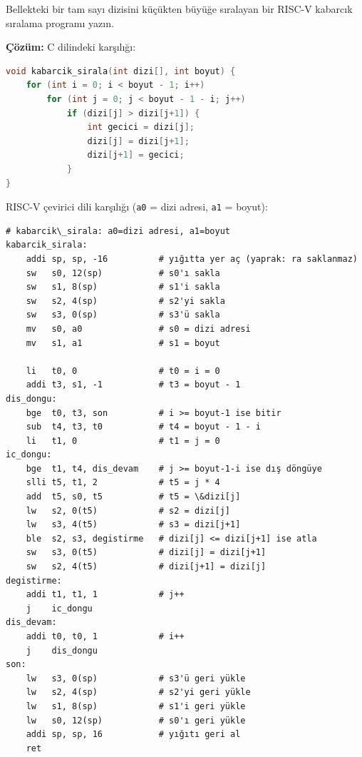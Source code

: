 \begin{ornek}[4.8]
\label{orn:kabarcik-siralama}
Bellekteki bir tam sayı dizisini küçükten büyüğe sıralayan bir RISC-V kabarcık sıralama programı yazın.

\textbf{Çözüm:} C dilindeki karşılığı:

\begin{lstlisting}[language=C, style=alistirma-kod]
void kabarcik_sirala(int dizi[], int boyut) {
    for (int i = 0; i < boyut - 1; i++)
        for (int j = 0; j < boyut - 1 - i; j++)
            if (dizi[j] > dizi[j+1]) {
                int gecici = dizi[j];
                dizi[j] = dizi[j+1];
                dizi[j+1] = gecici;
            }
}
\end{lstlisting}

RISC-V çevirici dili karşılığı (\texttt{a0} = dizi adresi, \texttt{a1} = boyut):

\begin{lstlisting}[style=riscv]
# kabarcik\_sirala: a0=dizi adresi, a1=boyut
kabarcik_sirala:
    addi sp, sp, -16          # yığıtta yer aç (yaprak: ra saklanmaz)
    sw   s0, 12(sp)           # s0'ı sakla
    sw   s1, 8(sp)            # s1'i sakla
    sw   s2, 4(sp)            # s2'yi sakla
    sw   s3, 0(sp)            # s3'ü sakla
    mv   s0, a0               # s0 = dizi adresi
    mv   s1, a1               # s1 = boyut

    li   t0, 0                # t0 = i = 0
    addi t3, s1, -1           # t3 = boyut - 1
dis_dongu:
    bge  t0, t3, son          # i >= boyut-1 ise bitir
    sub  t4, t3, t0           # t4 = boyut - 1 - i
    li   t1, 0                # t1 = j = 0
ic_dongu:
    bge  t1, t4, dis_devam    # j >= boyut-1-i ise dış döngüye
    slli t5, t1, 2            # t5 = j * 4
    add  t5, s0, t5           # t5 = \&dizi[j]
    lw   s2, 0(t5)            # s2 = dizi[j]
    lw   s3, 4(t5)            # s3 = dizi[j+1]
    ble  s2, s3, degistirme   # dizi[j] <= dizi[j+1] ise atla
    sw   s3, 0(t5)            # dizi[j] = dizi[j+1]
    sw   s2, 4(t5)            # dizi[j+1] = dizi[j]
degistirme:
    addi t1, t1, 1            # j++
    j    ic_dongu
dis_devam:
    addi t0, t0, 1            # i++
    j    dis_dongu
son:
    lw   s3, 0(sp)            # s3'ü geri yükle
    lw   s2, 4(sp)            # s2'yi geri yükle
    lw   s1, 8(sp)            # s1'i geri yükle
    lw   s0, 12(sp)           # s0'ı geri yükle
    addi sp, sp, 16           # yığıtı geri al
    ret
\end{lstlisting}


\end{ornek}
